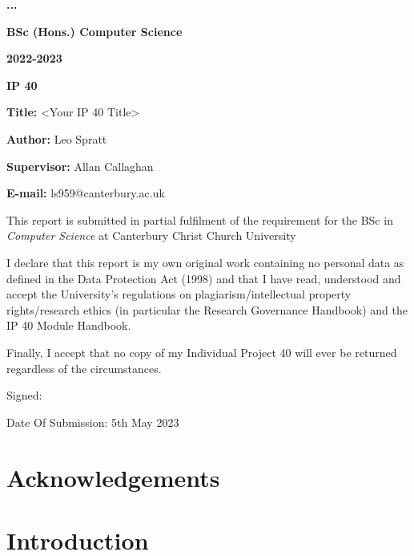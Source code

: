\documentclass[a4paper,12pt]{report}
\begin{document}
\begin{titlepage}

	\begin{center}
		\textbf{...}

		\textbf{BSc (Hons.) Computer Science}

		\textbf{2022-2023}

		\textbf{IP 40}

		\vspace{4ex}

		\textbf{Title:} <Your IP 40 Title>

        \textbf{Author:} Leo Spratt

        \textbf{Supervisor:} Allan Callaghan

        \textbf{E-mail:} ls959@canterbury.ac.uk

		\vspace{4ex}

        \small{This report is submitted in partial fulfilment of the requirement for the BSc in \textsl{Computer Science} at Canterbury Christ Church University

		I declare that this report is my own original work containing no personal data as defined in the Data Protection Act (1998) and that I have read, understood and accept the University's regulations on plagiarism/intellectual property rights/research ethics (in particular the Research Governance Handbook) and the IP 40 Module Handbook.

        Finally, I accept that no copy of my Individual Project 40 will ever be returned regardless of the circumstances.}

		Signed: \verb|              |

		Date Of Submission: 5th May 2023
	\end{center}
\end{titlepage}


\begin{abstract}
	
\end{abstract}
\chapter*{Acknowledgements}

\tableofcontents
\newpage
\listoffigures
\newpage
\listoftables
\newpage
\lstlistoflistings
\newpage
\chapter{Introduction}

\end{document}
